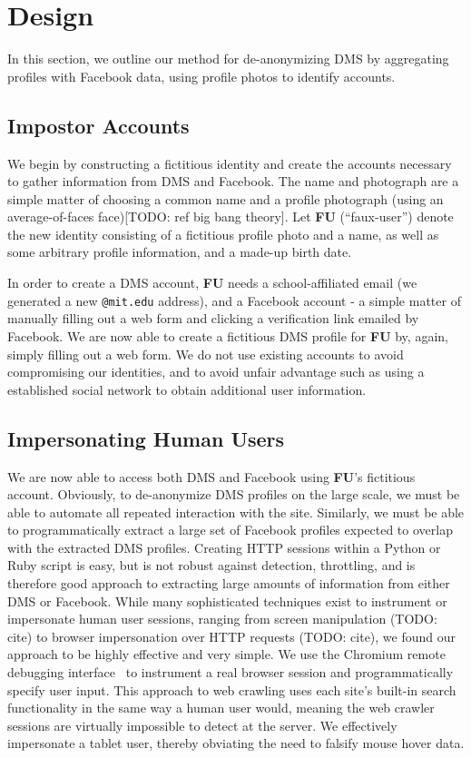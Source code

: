 \section{Design}
\label{sec:design}

In this section, we outline our method for de-anonymizing DMS by aggregating profiles with Facebook data, using profile photos to identify accounts.

\subsection{Impostor Accounts}
\label{sec:design_accounts}

We begin by constructing a fictitious identity and create the accounts necessary to gather information from DMS and Facebook.
The name and photograph are a simple matter of choosing a common name and a profile photograph (using an average-of-faces face)[TODO: ref big bang theory]. Let \textbf{FU} (``faux-user'') denote the new identity consisting of a fictitious profile photo and a name, as well as some arbitrary profile information, and a made-up birth date.

In order to create a DMS account, \textbf{FU} needs a school-affiliated email (we generated a new \texttt{@mit.edu} address), and a Facebook account - a simple matter of manually filling out a web form and clicking a verification link emailed by Facebook. We are now able to create a fictitious DMS profile for \textbf{FU} by, again, simply filling out a web form.
We do not use existing accounts to avoid compromising our identities, and to avoid unfair advantage such as using a established social network to obtain additional user information.

\subsection{Impersonating Human Users}
\label{sec:design_debug}

We are now able to access both DMS and Facebook using \textbf{FU}'s fictitious account.
Obviously, to de-anonymize DMS profiles on the large scale, we must be able to automate all repeated interaction with the site.
Similarly, we must be able to programmatically extract a large set of Facebook profiles expected to overlap with the extracted DMS profiles.
Creating HTTP sessions within a Python or Ruby script is easy, but is not robust against detection, throttling, and is therefore good approach to extracting large amounts of information from either DMS or Facebook.
While many sophisticated techniques exist to instrument or impersonate human user sessions, ranging from screen manipulation (TODO: cite) to browser impersonation over HTTP requests (TODO: cite), we found our approach to be highly effective and very simple.
We use the Chromium remote debugging interface~\cite{chrome-rdb} to instrument a real browser session and programmatically specify user input.
This approach to web crawling uses each site's built-in search functionality in the same way a human user would, meaning the web crawler sessions are virtually impossible to detect at the server.
We effectively impersonate a tablet user, thereby obviating the need to falsify mouse hover data.

